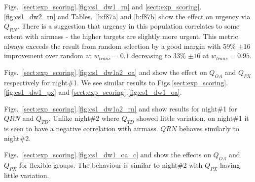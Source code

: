 Figs.~\ref{sect:exp_scoring}.\ref{fig:cs1_dw1_rn} and \ref{sect:exp_scoring}.\ref{fig:cs1_dw2_rn} and Tables.~\ref{b:f87a} and \ref{b:f87b} show the effect on urgency via $Q_{RN}$. There is a suggestion that urgency in this population correlates to some extent with airmass - the higher targets are slightly more urgent. This metric always exceeds the result from random selection by a good margin with 59\% $\pm 16$ improvement over random at $w_{trans}=0.1$ decreasing to 33\% $\pm 16$ at $w_{trans}=0.95$.

Figs.~\ref{sect:exp_scoring}.\ref{fig:cs1_dw1a2_oa} and  show the effect on $Q_{OA}$ and $Q_{PX}$ respectively for night\#1. We see similar results to Figs.\ref{sect:exp_scoring}.\ref{fig:cs1_dw1_px} and \ref{sect:exp_scoring}.\ref{fig:cs1_dw1_oa}.

Figs.~\ref{sect:exp_scoring}.\ref{fig:cs1_dw1a2_rn} and  show results for night\#1 for $Q{RN}$ and $Q_{TD}$. Unlike night\#2 where $Q_{TD}$ showed little variation, on night\#1 it is seen to have a negative correlation with airmass. $Q{RN}$ behaves similarly to night\#2. 

Figs.~\ref{sect:exp_scoring}.\ref{fig:cs1_dw1_oa_c} and  show the effects on $Q_{OA}$ and $Q_{PX}$ for flexible groups. The behaviour is similar to night\#2 with $Q_{PX}$ having little variation.


